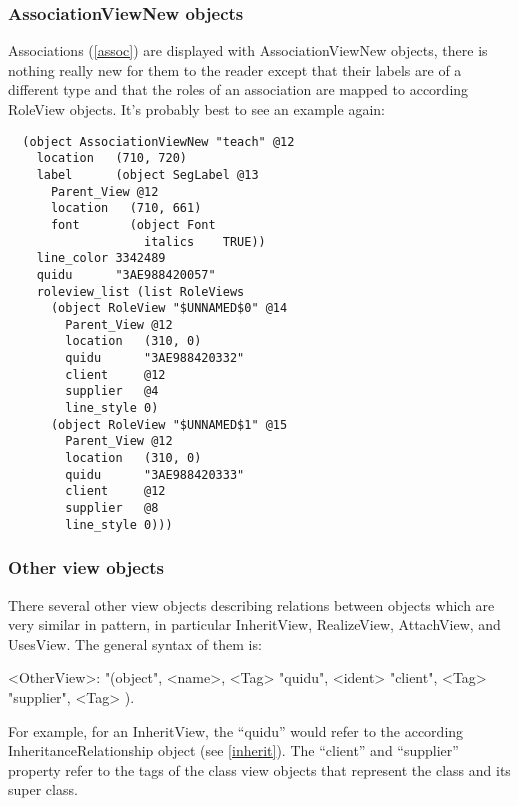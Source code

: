 \documentclass{article}
\newenvironment{mygrammar}{\begin{grammar}%
      [(colon){ $\rightarrow$}]%
      [(semicolon)$|$]%
      [(comma){ }]%
      [(period){\\}]%
      [(quote){\begin{bf}}{\end{bf}}]%
      [(nonterminal){$\langle$}{$\rangle$}]}%
      {\end{grammar}}
\begin{document}
\subsubsection{AssociationViewNew objects}

Associations (\ref{assoc}) are displayed with AssociationViewNew
objects, there is nothing really new for them to the reader except
that their labels are of a different type and that the roles of an
association are mapped to according RoleView objects. It's probably
best to see an example again:

\begin{verbatim}
  (object AssociationViewNew "teach" @12
    location   (710, 720)
    label      (object SegLabel @13
      Parent_View @12
      location   (710, 661)
      font       (object Font
                   italics    TRUE))
    line_color 3342489
    quidu      "3AE988420057"
    roleview_list (list RoleViews
      (object RoleView "$UNNAMED$0" @14
        Parent_View @12
        location   (310, 0)
        quidu      "3AE988420332"
        client     @12
        supplier   @4
        line_style 0)
      (object RoleView "$UNNAMED$1" @15
        Parent_View @12
        location   (310, 0)
        quidu      "3AE988420333"
        client     @12
        supplier   @8
        line_style 0)))
\end{verbatim}

\subsubsection{Other view objects}

There several other view objects describing relations between objects
which are very similar in pattern, in particular InheritView,
RealizeView, AttachView, and UsesView. The general syntax of them is:

\begin{mygrammar}
<OtherView>: "(object", <name>, <Tag>\newline
        "quidu",        <ident>\newline
        "client",       <Tag>\newline
        "supplier",     <Tag>\newline
).
\end{mygrammar}

For example, for an InheritView, the ``quidu'' would refer to the
according InheritanceRelationship object (see \ref{inherit}). The
``client'' and ``supplier'' property refer to the tags of the class view
objects that represent the class and its super class.
\end{document}
